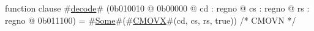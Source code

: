function clause #\hyperref[zdecode]{decode}# (0b010010 @ 0b00000 @ cd : regno @ cs : regno @ rs : regno @ 0b011100) = #\hyperref[zSome]{Some}#(#\hyperref[zCMOVX]{CMOVX}#(cd, cs, rs, true))  /* CMOVN */
